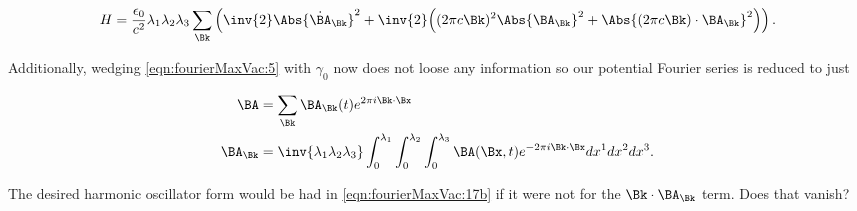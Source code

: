 \begin{align}
\label{eqn:fourierMaxVac:17b}
H = 
\frac{\epsilon_0}{c^2} \lambda_1 \lambda_2 \lambda_3 \sum_\Bk
\left(
\inv{2} \Abs{\dot{\BA}_\Bk}^2
+
\inv{2} \Bigl(
(2 \pi c \Bk)^2 \Abs{\BA_\Bk}^2 + \Abs{ ( 2 \pi c \Bk) \cdot \BA_\Bk}^2
\Bigr)
\right).
\end{align}

Additionally, wedging \autoref{eqn:fourierMaxVac:5} with $\gamma_0$ now does not loose any information so our potential Fourier series is reduced to just

\begin{subequations}
\label{eqn:fourierMaxVac:5b}
\begin{align}
\BA &= \sum_{\Bk} \BA_\Bk(t) e^{2 \pi i \Bk \cdot \Bx} \\
\BA_\Bk &= 
\inv{ \lambda_1 \lambda_2 \lambda_3 }
\int_0^{\lambda_1}
\int_0^{\lambda_2}
\int_0^{\lambda_3} \BA(\Bx, t) e^{-2 \pi i \Bk \cdot \Bx} dx^1 dx^2 dx^3.
\end{align}
\end{subequations}

The desired harmonic oscillator form would be had in \autoref{eqn:fourierMaxVac:17b} if it were not for the $\Bk \cdot \BA_\Bk$ term.  Does that vanish?

\EndArticle

